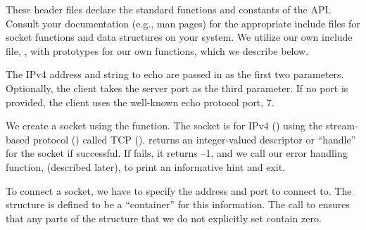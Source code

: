\begin{topcode}


\begin{bottomcode}


These header files declare the standard functions and constants of the
API.  Consult your documentation (e.g., man pages) for the appropriate
include files for socket functions and data structures on your system.  We
utilize our own include file, , with prototypes for our own
functions, which we describe below.


The IPv4 address and string to echo are passed in as the first two parameters. 
Optionally, the client takes the server port as the third parameter.  If no
port is provided, the client uses the well-known echo protocol port, 7.

\end{bottomcode}


We create a socket using the  function.  The socket is for
IPv4 () using the stream-based protocol
() called TCP (). 
 returns an integer-valued descriptor or
``handle'' for the socket if successful.
If  fails, it returns --1, and
we call our error handling function, 
(described later), to
print an informative hint and exit.


\begin{bottomcode}

To connect a socket, we have to specify the address and port to
connect to.  The  structure is defined to be a
``container'' for this information.  The call to 
ensures that any parts of the structure that we do not explicitly set
contain zero.



\end{bottomcode}
\end{topcode}

